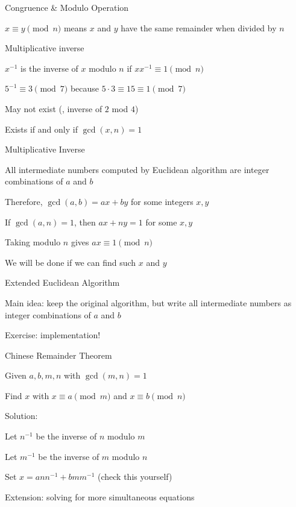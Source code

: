 \documentclass[13pt,onlymath]{beamer}
\begin{document}
\begin{frame}{Congruence \& Modulo Operation}
\BIT
\item $x \equiv y \pmod{n}$ means $x$ and $y$ have the same remainder when divided by $n$
\item Multiplicative inverse
\BIT
\item $x^{-1}$ is the inverse of $x$ modulo $n$ if $x x^{-1} \equiv 1 \pmod{n}$
\item $5^{-1} \equiv 3 \pmod{7}$ because $5 \cdot 3 \equiv 15 \equiv 1 \pmod{7}$
\item May not exist (\eg, inverse of $2$ mod $4$)
\item Exists if and only if $\gcd(x, n) = 1$
\EIT
\EIT
\end{frame}

\begin{frame}{Multiplicative Inverse}
\BIT
\item All intermediate numbers computed by Euclidean algorithm are integer combinations of $a$ and $b$
\BIT
\item Therefore, $\gcd(a, b) = ax+by$ for some integers $x, y$
\item If $\gcd(a, n) = 1$, then $ax + ny = 1$ for some $x, y$
\item Taking modulo $n$ gives $ax \equiv 1 \pmod{n}$
\EIT
\item We will be done if we can find such $x$ and $y$
\EIT
\end{frame}

\begin{frame}{Extended Euclidean Algorithm}
\BIT
\item Main idea: keep the original algorithm, but write all intermediate numbers as integer combinations of $a$ and $b$
\item Exercise: implementation!
\EIT
\end{frame}

\begin{frame}{Chinese Remainder Theorem}
\BIT
\item Given $a,b,m,n$ with $\gcd(m, n) = 1$
\item Find $x$ with $x\equiv a \pmod{m}$ and $x \equiv b \pmod{n}$

\item Solution:
\BIT
\item Let $n^{-1}$ be the inverse of $n$ modulo $m$
\item Let $m^{-1}$ be the inverse of $m$ modulo $n$
\item Set $x = a n n^{-1} + b m m^{-1}$ (check this yourself)
\EIT
\item Extension: solving for more simultaneous equations
\EIT
\end{frame}
\end{document}
